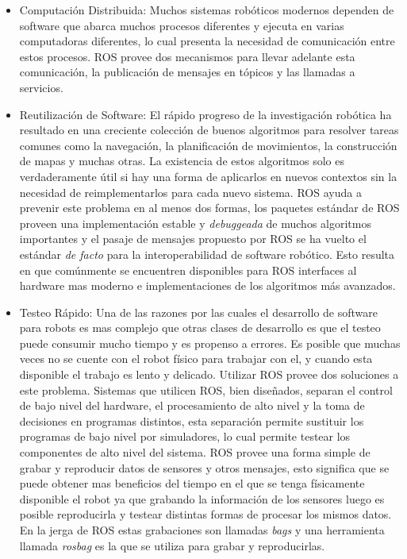 \documentclass[withindex,glossary]{cam-thesis}
\begin{document}
\begin{itemize}
  \item Computación Distribuida: Muchos sistemas robóticos modernos dependen de software que abarca muchos procesos diferentes y ejecuta  en varias computadoras diferentes, lo cual presenta la necesidad de comunicación entre estos procesos. ROS provee dos mecanismos para llevar adelante esta comunicación, la publicación de mensajes en tópicos y las llamadas a servicios.
  \item Reutilización de Software: El rápido progreso de la investigación robótica ha resultado en una creciente colección de buenos algoritmos para resolver tareas comunes como la navegación, la planificación de movimientos, la construcción de mapas y muchas otras. La existencia de estos algoritmos solo es verdaderamente útil si hay una forma de aplicarlos en nuevos contextos sin la necesidad de reimplementarlos para cada nuevo sistema. ROS ayuda a prevenir este problema en al menos dos formas, los paquetes estándar de ROS proveen una implementación estable y \textit{debuggeada} de muchos algoritmos importantes y el pasaje de mensajes propuesto por ROS se ha vuelto el estándar \textit{de facto} para la interoperabilidad de software robótico. Esto resulta en que comúnmente se encuentren disponibles para ROS interfaces al hardware mas moderno e implementaciones de los algoritmos más avanzados.
  \item Testeo Rápido: Una de las razones por las cuales el desarrollo de software para robots es mas complejo que otras clases de desarrollo es que el testeo puede consumir mucho tiempo y es propenso a errores. Es posible que muchas veces no se cuente con el robot físico para trabajar con el, y cuando esta disponible el trabajo es lento y delicado. Utilizar ROS provee dos soluciones a este problema. Sistemas que utilicen ROS, bien diseñados, separan el control de bajo nivel del hardware, el procesamiento de alto nivel y la toma de decisiones en programas distintos, esta separación permite sustituir los programas de bajo nivel por simuladores, lo cual permite testear los componentes de alto nivel del sistema. ROS provee una forma simple de grabar y reproducir datos de sensores y otros mensajes, esto significa que se puede obtener mas beneficios del tiempo en el que se tenga físicamente disponible el robot ya que grabando la información de los sensores luego es posible reproducirla y testear distintas formas de procesar los mismos datos. En la jerga de ROS estas grabaciones son llamadas \textit{bags} y una herramienta llamada \textit{rosbag} es la que se utiliza para grabar y reproducirlas.
\end{itemize}
\end{document}
